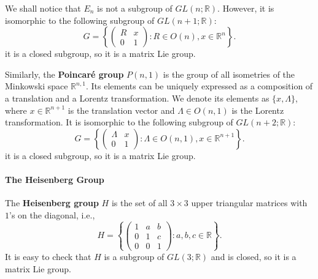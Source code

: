 \documentclass[../main.tex]{subfiles}
\begin{document}
We shall notice that $E_n$ is not a subgroup of $GL(n;\mathbb{R})$. However, it is isomorphic to the following subgroup of $GL(n+1;\mathbb{R})$:
\begin{equation*}
	G = \left\{ \begin{pmatrix}
		R & x \\
		0 & 1
	\end{pmatrix} : R \in O(n), x \in \mathbb{R}^n \right\}.
\end{equation*}
it is a closed subgroup, so it is a matrix Lie group.

Similarly, the \textbf{Poincar\'e group} $P(n,1)$ is the group of all isometries of the Minkowski space $\mathbb{R}^{n,1}$. Its elements can be uniquely expressed as a composition of a translation and a Lorentz transformation. We denote its elements as $\{x, \Lambda\}$, where $x \in \mathbb{R}^{n+1}$ is the translation vector and $\Lambda \in O(n,1)$ is the Lorentz transformation. It is isomorphic to the following subgroup of $GL(n+2;\mathbb{R})$:
\begin{equation*}
	G = \left\{ \begin{pmatrix}
		\Lambda & x \\
		0       & 1
	\end{pmatrix} : \Lambda \in O(n,1), x \in \mathbb{R}^{n+1} \right\}.
\end{equation*}
it is a closed subgroup, so it is a matrix Lie group.

\paragraph{The Heisenberg Group}
The \textbf{Heisenberg group} $H$ is the set of all $3 \times 3$ upper triangular matrices with $1$'s on the diagonal, i.e.,
\begin{equation*}
	H = \left\{ \begin{pmatrix}
		1 & a & b \\
		0 & 1 & c \\
		0 & 0 & 1
	\end{pmatrix} : a,b,c \in \mathbb{R} \right\}.
\end{equation*}
It is easy to check that $H$ is a subgroup of $GL(3;\mathbb{R})$ and is closed, so it is a matrix Lie group.
\end{document}
